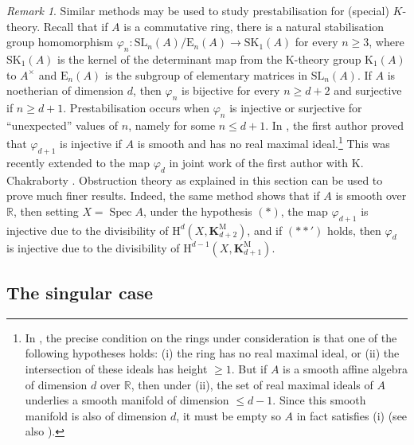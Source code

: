 \documentclass[11pt,leqno]{amsart}
\newcommand{\Spec}{\operatorname{Spec}}
\renewcommand{\1}{{\rm 1\hspace*{-0.4ex}%
\rule{0.1ex}{1.52ex}\hspace*{0.2ex}}}
\newcommand{\K}{{{\mathbf K}}}
\newcommand{\KM}{\K^{\mathrm M}}
\newcommand{\Hr}{{\mathrm {H}}}
\newcommand{\<}[1]{{\langle}#1 {\rangle}}
\newcommand{\Rb}{\mathbb{R}}
\newcommand{\Kr}{\mathrm{K}}
\newcommand{\Kbf}{\mathbf{K}}
\newcommand{\Er}{\mathrm{E}}
\newcommand{\Mr}{\mathrm{M}}
\theoremstyle{plain}
\newtheorem{thm}{Theorem}[section]
\theoremstyle{definition}
\theoremstyle{remark}
\newtheorem{rem}[thm]{Remark}
\numberwithin{equation}{section}
\begin{document}
\begin{rem}
Similar methods may be used to study prestabilisation for (special) $K$-theory. Recall that if $A$ is a commutative ring, there is a natural stabilisation group homomorphism $\varphi_n:\mathrm{SL}_n(A)/\Er_n(A)\to\mathrm{SK}_1(A)$ for every $n\geq 3$, where $\mathrm{SK}_1(A)$ is the kernel of the determinant map from the $\Kr$-theory group $\Kr_1(A)$ to $A^\times$ and $\Er_n(A)$ is the subgroup of elementary matrices in $\mathrm{SL}_n(A)$. If $A$ is noetherian of dimension $d$, then $\varphi_n$ is bijective for every $n\geq d+2$ and surjective if $n\geq d+1$. Prestabilisation occurs when $\varphi_n$ is injective or surjective for ``unexpected'' values of $n$, namely for some $n\leq d+1$. In \cite{banerjeeZeroCyclesMennicke2025}, the first author proved that $\varphi_{d+1}$ is injective if $A$ is smooth and has no real maximal ideal.\footnote{In \cite{banerjeeZeroCyclesMennicke2025}, the precise condition on the rings under consideration is that one of the following hypotheses holds: (i) the ring has no real maximal ideal, or (ii) the intersection of these ideals has height $\geq 1$. But if $A$ is a smooth affine algebra of dimension $d$ over $\Rb$, then under (ii), the set of real maximal ideals of $A$ underlies a smooth manifold of dimension $\leq d-1$. Since this smooth manifold is also of dimension $d$, it must be empty so $A$ in fact satisfies (i) (see also \cite[Example 3.16]{lerbetCohomologicalClassificationVector2026}).} This was recently extended to the map $\varphi_d$ in joint work of the first author with K. Chakraborty \cite[Lemma 9.2]{banerjeeImprovedInjectiveStability2026}. Obstruction theory as explained in this section can be used to prove much finer results. Indeed, the same method shows that if $A$ is smooth over $\Rb$, then setting $X=\Spec A$, under the hypothesis $(*)$, the map $\varphi_{d+1}$ is injective due to the divisibility of $\Hr^d(X,\Kbf_{d+2}^\Mr)$, and if $(**')$ holds, then $\varphi_d$ is injective due to the divisibility of $\Hr^{d-1}(X,\Kbf_{d+1}^\Mr)$.
\end{rem}

\subsection{The singular case}

\end{document}
